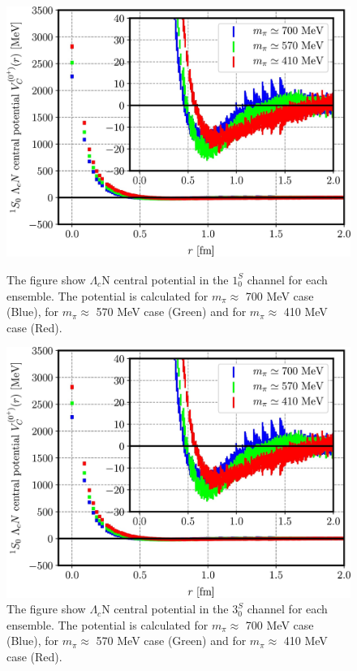 \documentclass[12pt,a4paper]{book}
\begin{document}
	\begin{figure}
		\centering
		\begin{minipage}{0.45\textwidth}
			\centering
			\includegraphics[width=0.74 \linewidth]{pictures/radial_potential_1s.jpg}
			\caption{ The figure show $\Lambda_c$N central potential in the $ 1^S_0$ channel for each ensemble. The potential is calculated for $m_\pi \approx$ 700 MeV case (Blue), for $m_\pi \approx$ 570 MeV case (Green) and for $m_\pi \approx$ 410 MeV case (Red).}
			\label{fig:fig:radial_potential_1s}
			
		\end{minipage}
		\begin{minipage}{0.5\textwidth}
			\centering
			\includegraphics[width=0.74 \linewidth]{pictures/radial_potential_1s.jpg}
			\caption{ The figure show $\Lambda_c$N central potential in the $ 3^S_0$ channel for each ensemble. The potential is calculated for $m_\pi \approx$ 700 MeV case (Blue), for $m_\pi \approx$  570 MeV case (Green) and for $m_\pi \approx$  410 MeV case (Red).}
			\label{ffig:fig:radial_potential_3s}
		\end{minipage}%
	\end{figure}
	
\end{document}
